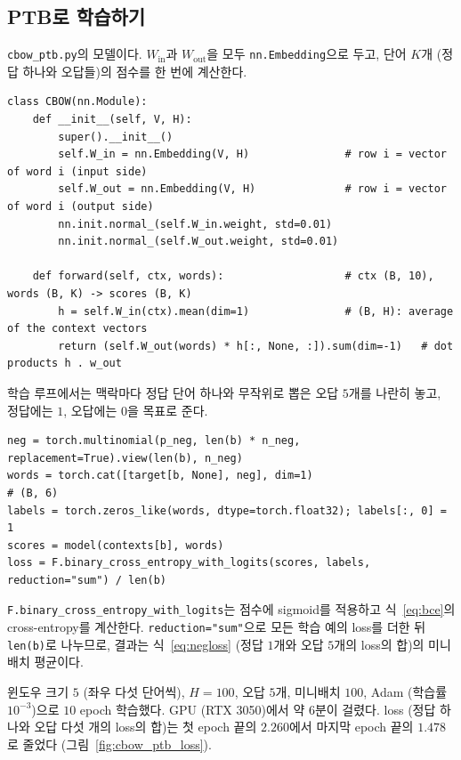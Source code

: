 \documentclass[11pt,a4paper]{article}
\newcommand{\figref}[1]{그림~\ref{fig:#1}}
\newcommand{\eqnref}[1]{식~\eqref{eq:#1}}
\begin{document}
\subsection{PTB로 학습하기}

\texttt{cbow\_ptb.py}의 모델이다. $W_{\text{in}}$과 $W_{\text{out}}$을 모두 \texttt{nn.Embedding}으로 두고, 단어 $K$개 (정답 하나와 오답들)의 점수를 한 번에 계산한다.

\begin{lstlisting}
class CBOW(nn.Module):
    def __init__(self, V, H):
        super().__init__()
        self.W_in = nn.Embedding(V, H)               # row i = vector of word i (input side)
        self.W_out = nn.Embedding(V, H)              # row i = vector of word i (output side)
        nn.init.normal_(self.W_in.weight, std=0.01)
        nn.init.normal_(self.W_out.weight, std=0.01)

    def forward(self, ctx, words):                   # ctx (B, 10), words (B, K) -> scores (B, K)
        h = self.W_in(ctx).mean(dim=1)               # (B, H): average of the context vectors
        return (self.W_out(words) * h[:, None, :]).sum(dim=-1)   # dot products h . w_out
\end{lstlisting}

학습 루프에서는 맥락마다 정답 단어 하나와 무작위로 뽑은 오답 $5$개를 나란히 놓고, 정답에는 $1$, 오답에는 $0$을 목표로 준다.

\begin{lstlisting}
neg = torch.multinomial(p_neg, len(b) * n_neg, replacement=True).view(len(b), n_neg)
words = torch.cat([target[b, None], neg], dim=1)                       # (B, 6)
labels = torch.zeros_like(words, dtype=torch.float32); labels[:, 0] = 1
scores = model(contexts[b], words)
loss = F.binary_cross_entropy_with_logits(scores, labels, reduction="sum") / len(b)
\end{lstlisting}

\texttt{F.binary\_cross\_entropy\_with\_logits}는 점수에 sigmoid를 적용하고 \eqnref{bce}의 cross-entropy를 계산한다.
\texttt{reduction="sum"}으로 모든 학습 예의 loss를 더한 뒤 \texttt{len(b)}로 나누므로, 결과는 \eqnref{negloss} (정답 $1$개와 오답 $5$개의 loss의 합)의 미니배치 평균이다.

윈도우 크기 $5$ (좌우 다섯 단어씩), $H=100$, 오답 $5$개, 미니배치 $100$, Adam (학습률 $10^{-3}$)으로 $10$ epoch 학습했다.
GPU (RTX 3050)에서 약 $6$분이 걸렸다. loss (정답 하나와 오답 다섯 개의 loss의 합)는 첫 epoch 끝의 $2.260$에서 마지막 epoch 끝의 $1.478$로 줄었다 (\figref{cbow_ptb_loss}).
\end{document}
